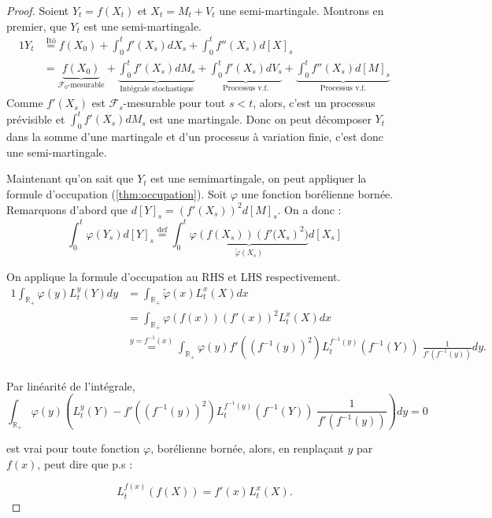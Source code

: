 \documentclass[openany]{book}
\newcommand{\F}{\mathscr{F}}
\newcommand{\R}{\mathbb{R}}
\theoremstyle{thmfont}
\theoremstyle{deffont}
\theoremstyle{thmfont}
\theoremstyle{deffont}
\begin{document}
\begin{proof}
  Soient $Y_t = f(X_t)$ et $X_t = M_t + V_t$ une semi-martingale. Montrons en premier, que $Y_t$ est une semi-martingale. 
  \begin{alignat*}{1}
    Y_t &\overset{\text{Itō}}{=} f(X_0) + \int_0^t f'(X_s) dX_s + \int_0^t f''(X_s) d[X]_s\\
        &= \underbrace{f(X_0)}_{\F_0\text{-mesurable}} + \underbrace{\int_0^t f'(X_s) dM_s}_{\text{Intégrale stochastique}} + \underbrace{\int_0^t f'(X_s) dV_s}_{\text{Processus v.f.}} + \underbrace{\int_0^t f''(X_s) d[M]_s}_{\text{Processus v.f.}}
  \end{alignat*}
  Comme $f'(X_s)$ est $\F_s$-mesurable pour tout $s<t$, alors, c'est un processus prévisible et $\int_0^t f'(X_s) dM_s$ est une martingale.
  Donc on peut décomposer $Y_t$ dans la somme d'une martingale et d'un processus à variation finie, c'est donc une semi-martingale.


  
Maintenant qu'on sait que $Y_t$ est une semimartingale, on peut appliquer la formule d'occupation (\autoref{thm:occupation}). Soit $\varphi$ une fonction borélienne bornée. Remarquons d'abord que $d[Y]_s = \left(f'(X_s)\right)^2 d[M]_s$. On a donc :
$$  \int_0^t \varphi(Y_s) d[Y]_s \overset{\text{def}}{=} \int_0^t \underbrace{\varphi(f(X_s)) \left(f'(X_s\right)^2)}_{\tilde\varphi(X_s)} d[X_s]
$$

On applique la formule d'occupation au RHS et LHS respectivement.
\begin{alignat*}{1}
\int_{\R_+} \varphi(y) L_t^y(Y) dy &= \int_{\R_+} \tilde\varphi(x) L_t^x(X) dx\\
                         &= \int_{\R_+}\varphi(f(x)) \left(f'(x)\right)^2 L_t^x(X) dx\\
                      &\overset{y = f^{-1}(x)}{=} \int_{\R_+}\varphi(y) f'( (f^{-1}(y))^2) L_t^{f^{-1}(y)}(f^{-1}(Y)) \; \frac{1}{f'(f^{-1}(y))} dy.\\
\end{alignat*}

Par linéarité de l'intégrale, 
$$\int_{\R_+} \varphi(y) \left( L_t^y(Y) -  f'\left((f^{-1}(y))^2\right) L_t^{f^{-1}(y)}(f^{-1}(Y)) \; \frac{1}{f'(f^{-1}(y))}\right) dy  = 0 $$

est vrai pour toute fonction $\varphi$, borélienne bornée, alors, en renplaçant $y$ par $f(x)$, peut dire que p.s :

$$L_t^{f(x)}(f(X)) =  f'(x) L_t^{x}(X).$$
\end{proof}
\end{document}
